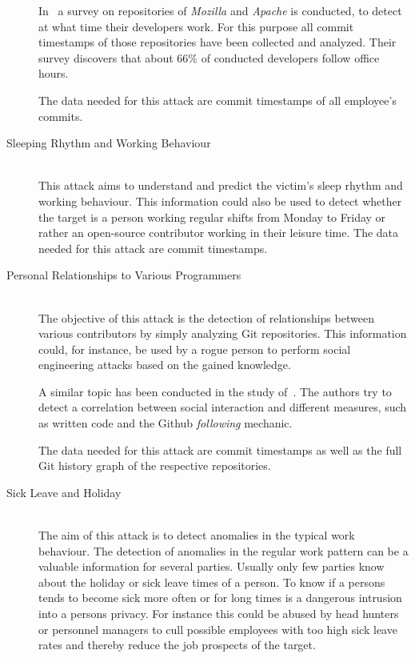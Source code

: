 \begin{description}
        In~\cite{article:do-programmers-work-at-night} a survey on repositories of \emph{Mozilla} and \emph{Apache} is conducted, to detect at what time their developers work.
        For this purpose all commit timestamps of those repositories have been collected and analyzed.
        Their survey discovers that about 66\% of conducted developers follow office hours.

        The data needed for this attack are commit timestamps of all employee's commits.

    \item[Sleeping Rhythm and Working Behaviour] \hfill \\
        This attack aims to understand and predict the victim's sleep rhythm and working behaviour.
        This information could also be used to detect whether the target is a person working regular shifts from Monday to Friday or rather an open-source contributor working in their leisure time.
        The data needed for this attack are commit timestamps.

    \item[Personal Relationships to Various Programmers] \hfill \\
        The objective of this attack is the detection of relationships between various contributors by simply analyzing Git repositories.
        This information could, for instance, be used by a rogue person to perform social engineering attacks based on the gained knowledge.

        A similar topic has been conducted in the study of~\cite{inproceedings:exploring-the-ecosystem}.
        The authors try to detect a correlation between social interaction and different measures, such as written code and the Github \emph{following} mechanic.

        The data needed for this attack are commit timestamps as well as the full Git history graph of the respective repositories.

    \item[Sick Leave and Holiday] \hfill \\
        The aim of this attack is to detect anomalies in the typical work behaviour.
        The detection of anomalies in the regular work pattern can be a valuable information for several parties.
        Usually only few parties know about the holiday or sick leave times of a person.
        To know if a persons tends to become sick more often or for long times is a dangerous intrusion into a persons privacy.
        For instance this could be abused by head hunters or personnel managers to cull possible employees with too high sick leave rates and thereby reduce the job prospects of the target.


\end{description}
